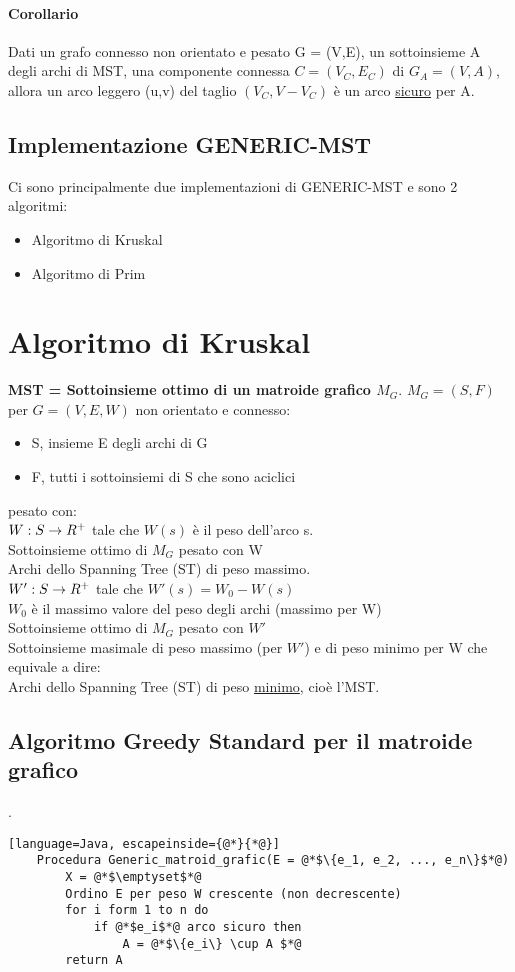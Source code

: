 \paragraph*{Corollario} Dati un grafo connesso non orientato e pesato G = (V,E), un
sottoinsieme A degli archi di MST, una componente connessa $C = (V_C, E_C)$ di $G_A = (V,A)$,
allora un arco leggero (u,v) del taglio $(V_C, V-V_C)$ è un arco \underline{sicuro} per A.
\subsection{Implementazione GENERIC-MST}
Ci sono principalmente due implementazioni di GENERIC-MST e sono 2 algoritmi:
\begin{itemize}
    \item Algoritmo di Kruskal
    \item Algoritmo di Prim
\end{itemize}
\section{Algoritmo di Kruskal}
\textbf{MST = Sottoinsieme ottimo di un matroide grafico $M_G$}.
$M_G = (S,F)$ per $G=(V,E,W)$ non orientato e connesso:
\begin{itemize}
    \item S, insieme E degli archi di G
    \item F, tutti i sottoinsiemi di S che sono aciclici
\end{itemize}
pesato con:\\
$W:S \rightarrow R^+$ tale che $W(s)$ è il peso dell'arco s.\\
Sottoinsieme ottimo di $M_G$ pesato con W\\
\ra Archi dello Spanning Tree (ST) di peso massimo.\\
$W':S \rightarrow R^+$ tale che $W'(s) = W_0 - W(s)$\\
$W_0$ è il massimo valore del peso degli archi (massimo per W)\\
Sottoinsieme ottimo di $M_G$ pesato con $W'$\\
\ra Sottoinsieme masimale di peso massimo (per $W'$) e di peso minimo per W che equivale a dire:\\
\ra Archi dello Spanning Tree (ST) di peso \underline{minimo}, cioè l'MST.
\subsection{Algoritmo Greedy Standard per il matroide grafico}.
\begin{lstlisting}[language=Java, escapeinside={@*}{*@}]
    Procedura Generic_matroid_grafic(E = @*$\{e_1, e_2, ..., e_n\}$*@)
        X = @*$\emptyset$*@
        Ordino E per peso W crescente (non decrescente)
        for i form 1 to n do
            if @*$e_i$*@ arco sicuro then
                A = @*$\{e_i\} \cup A $*@
        return A
\end{lstlisting}
